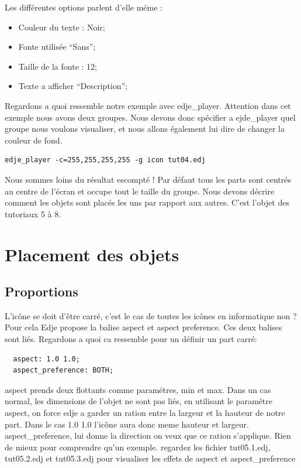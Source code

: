 \documentclass[a4paper]{efr}
\begin{document}
Les différentes options parlent d'elle méme :
\begin{itemize}
\item Couleur du texte : Noir;
\item Fonte utilisée ``Sans'';
\item Taille de la fonte : 12;
\item Texte a afficher ``Description'';
\end{itemize}

Regardons a quoi ressemble notre exemple avec edje\_player. Attention dans cet
exemple nous avons deux groupes. Nous devons donc spécifier a ejde\_player quel
groupe nous voulons visualiser, et nous allons également lui dire de changer la
couleur de fond.

\begin{lstlisting}
edje_player -c=255,255,255,255 -g icon tut04.edj
\end{lstlisting}

Nous sommes loins du résultat escompté ! Par défaut tous les parts sont
centrés au centre de l'écran et occupe tout le taille du groupe. Nous devons
décrire comment les objets sont placés les uns par rapport aux autres.
C'est l'objet des tutoriaux 5 à 8.


\section{Placement des objets}
\subsection{Proportions}

L'icône se doit d'être carré, c'est le cas de toutes les icônes en informatique
non ?  Pour cela Edje propose la balise aspect et aspect preference. Ces deux
balises sont liés. Regardons a quoi ca ressemble pour un définir un part carré:
\begin{lstlisting}
  aspect: 1.0 1.0;
  aspect_preference: BOTH;
\end{lstlisting}

aspect prends deux flottants comme paramétres, min et max. Dans un cas normal,
les dimensions de l'objet ne sont pas liés, en utilisant le paramétre aspect,
on force edje a garder un ration entre la largeur et la hauteur de notre part.
Dans le cas 1.0 1.0 l'icône aura donc meme hauteur et largeur.
aspect\_preference, lui donne la direction on veux que ce ration s'applique.
Rien de mieux pour comprendre qu'un exemple. regardez les fichier tut05.1.edj,
tut05.2.edj et tut05.3.edj pour visualiser les effets de aspect et
aspect\_preference
\end{document}
